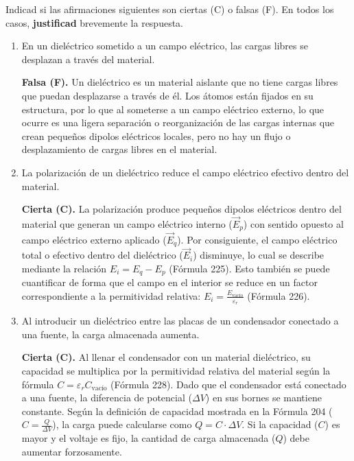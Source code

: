 \documentclass[11pt, a4paper]{article}
\newenvironment{problem}[1][Cuestión]{
		\vspace{0.5cm}
		\noindent{\Large\bfseries #1} \par\vspace{0.5cm}
}{
		\vspace{0.5cm}
}
\begin{document}
	\begin{problem}[Cuestión 6]
		Indicad si las afirmaciones siguientes son ciertas (C) o falsas (F). En todos los casos, \textbf{justificad} brevemente la respuesta.

		\begin{enumerate}[label=\alph*)] 
			\item En un dieléctrico sometido a un campo eléctrico, las cargas libres se desplazan a través del material.

				{ \color{blue} 
					\textbf{Falsa (F).} Un dieléctrico es un material aislante que no tiene cargas libres que puedan desplazarse a través de él. Los átomos están fijados en su estructura, por lo que al someterse a un campo eléctrico externo, lo que ocurre es una ligera separación o reorganización de las cargas internas que crean pequeños dipolos eléctricos locales, pero no hay un flujo o desplazamiento de cargas libres en el material.
				}

			\item La polarización de un dieléctrico reduce el campo eléctrico efectivo dentro del material.

				{ \color{blue} 
					\textbf{Cierta (C).} La polarización produce pequeños dipolos eléctricos dentro del material que generan un campo eléctrico interno ($\vec{E}_p$) con sentido opuesto al campo eléctrico externo aplicado ($\vec{E}_q$). Por consiguiente, el campo eléctrico total o efectivo dentro del dieléctrico ($\vec{E}_i$) disminuye, lo cual se describe mediante la relación $E_i = E_q - E_p$ (Fórmula 225). Esto también se puede cuantificar de forma que el campo en el interior se reduce en un factor correspondiente a la permitividad relativa: $E_i = \frac{E_{\text{vacío}}}{\varepsilon_r}$ (Fórmula 226).
				}

			\item Al introducir un dieléctrico entre las placas de un condensador conectado a una fuente, la carga almacenada aumenta.

				{ \color{blue} 
					\textbf{Cierta (C).} Al llenar el condensador con un material dieléctrico, su capacidad se multiplica por la permitividad relativa del material según la fórmula $C = \varepsilon_r C_{\text{vacío}}$ (Fórmula 228). Dado que el condensador está conectado a una fuente, la diferencia de potencial ($\Delta V$) en sus bornes se mantiene constante. Según la definición de capacidad mostrada en la Fórmula 204 ($C = \frac{Q}{\Delta V}$), la carga puede calcularse como $Q = C \cdot \Delta V$. Si la capacidad ($C$) es mayor y el voltaje es fijo, la cantidad de carga almacenada ($Q$) debe aumentar forzosamente.
				}
		\end{enumerate}
	\end{problem}
\end{document}
